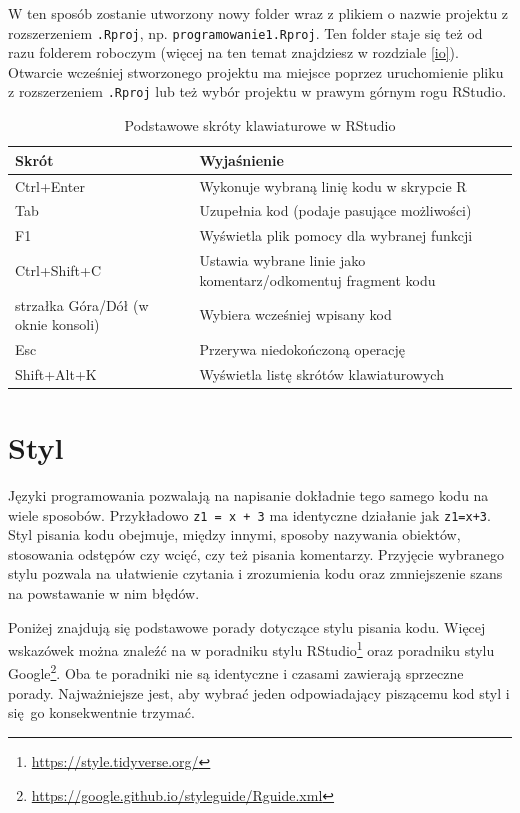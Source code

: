 \documentclass[paper=6in:9in,pagesize=pdftex,headinclude=on,footinclude=on,10pt]{scrbook}
\DeclareRobustCommand{\href}[2]{#2\footnote{\url{#1}}}
\begin{document}
W ten sposób zostanie utworzony nowy folder wraz z plikiem o nazwie projektu z rozszerzeniem \texttt{.Rproj}, np. \texttt{programowanie1.Rproj}.
Ten folder staje się też od razu folderem roboczym (więcej na ten temat znajdziesz w rozdziale \ref{io}).
Otwarcie wcześniej stworzonego projektu ma miejsce poprzez uruchomienie pliku z rozszerzeniem \texttt{.Rproj} lub też wybór projektu w prawym górnym rogu RStudio.

\begin{table}

\caption{\label{tab:rstudiosk}Podstawowe skróty klawiaturowe w RStudio}
\centering
\begin{tabular}[t]{>{\raggedright\arraybackslash}p{12em}>{\raggedright\arraybackslash}p{18em}}
\toprule
Skrót & Wyjaśnienie\\
\midrule
Ctrl+Enter & Wykonuje wybraną linię kodu w skrypcie R\\
Tab & Uzupełnia kod (podaje pasujące możliwości)\\
F1 & Wyświetla plik pomocy dla wybranej funkcji\\
Ctrl+Shift+C & Ustawia wybrane linie jako komentarz/odkomentuj fragment kodu\\
strzałka Góra/Dół (w oknie konsoli) & Wybiera wcześniej wpisany kod\\
\addlinespace
Esc & Przerywa niedokończoną operację\\
Shift+Alt+K & Wyświetla listę skrótów klawiaturowych\\
\bottomrule
\end{tabular}
\end{table}

\hypertarget{styl}{%
\section{Styl}\label{styl}}

Języki programowania pozwalają na napisanie dokładnie tego samego kodu na wiele sposobów.
Przykładowo \texttt{z1\ =\ x\ +\ 3} ma identyczne działanie jak \texttt{z1=x+3}.
Styl pisania kodu obejmuje, między innymi, sposoby nazywania obiektów, stosowania odstępów czy wcięć, czy też pisania komentarzy.
Przyjęcie wybranego stylu pozwala na ułatwienie czytania i zrozumienia kodu oraz zmniejszenie szans na powstawanie w nim błędów.

Poniżej znajdują się podstawowe porady dotyczące stylu pisania kodu.
Więcej wskazówek można znaleźć na w \href{https://style.tidyverse.org/}{poradniku stylu RStudio} oraz \href{https://google.github.io/styleguide/Rguide.xml}{poradniku stylu Google}.
Oba te poradniki nie są identyczne i czasami zawierają sprzeczne porady.
Najważniejsze jest, aby wybrać jeden odpowiadający piszącemu kod styl i się~go konsekwentnie trzymać.
\end{document}
